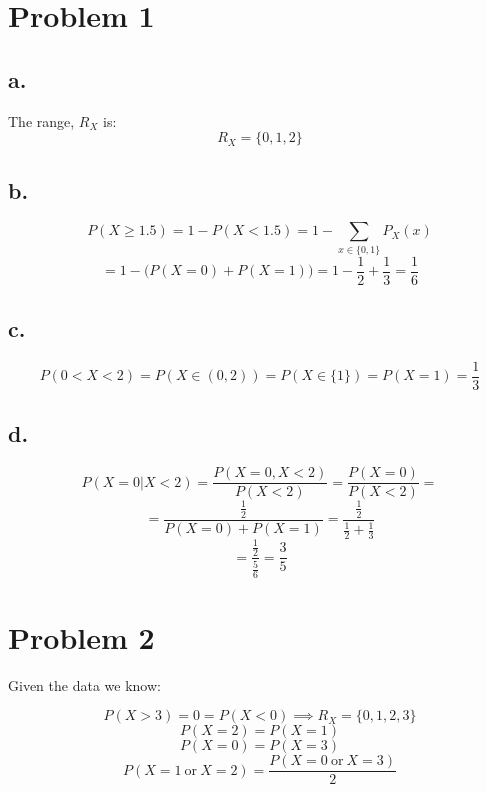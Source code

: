 \documentclass{article}
\begin{document}
\section*{Problem 1}

\subsection*{a.}
The range, \(R_{X}\) is:
\begin{equation*}
    R_{X} = \{0, 1, 2\}
\end{equation*}
\subsection*{b.}
\begin{equation*}
    P(X \geq 1.5) = 1 - P(X < 1.5) = 1 - \sum_{x \in \{0, 1\}}P_{X}(x)
\end{equation*}
\begin{equation*}
    = 1 - \Big(P(X=0) + P(X=1)\Big) = 1 - \frac{1}{2} + \frac{1}{3} = \frac{1}{6}
\end{equation*}
\subsection*{c.}
\begin{equation*}
    P(0 < X < 2) = P(X \in (0, 2)) = P(X \in \{1\}) = P(X = 1) = \frac{1}{3}
\end{equation*}
\subsection*{d.}
\begin{equation*}
    P(X=0|X<2) = \frac{P(X=0, X < 2)}{P(X < 2)} = \frac{P(X = 0)}{P(X < 2)} = 
\end{equation*}
\begin{equation*}
    = \frac{\frac{1}{2}}{P(X=0) + P(X=1)} = \frac{\frac{1}{2}}{\frac{1}{2} + \frac{1}{3}}
\end{equation*}
\begin{equation*}
    = \frac{\frac{1}{2}}{\frac{5}{6}} = \frac{3}{5}
\end{equation*}

\section*{Problem 2}

Given the data we know:

\begin{equation*}
    P(X > 3) = 0 = P(X < 0) \implies R_{X} = \{0, 1, 2, 3\}
\end{equation*}
\begin{equation*}
    P(X=2) = P(X=1)
\end{equation*}
\begin{equation*}
    P(X=0) = P(X=3)
\end{equation*}
\begin{equation*}
   P(X=1 \ \mbox{or} \ X=2) = \frac{P(X=0 \ \mbox{or} \ X=3)}{2}
\end{equation*}
\end{document}
